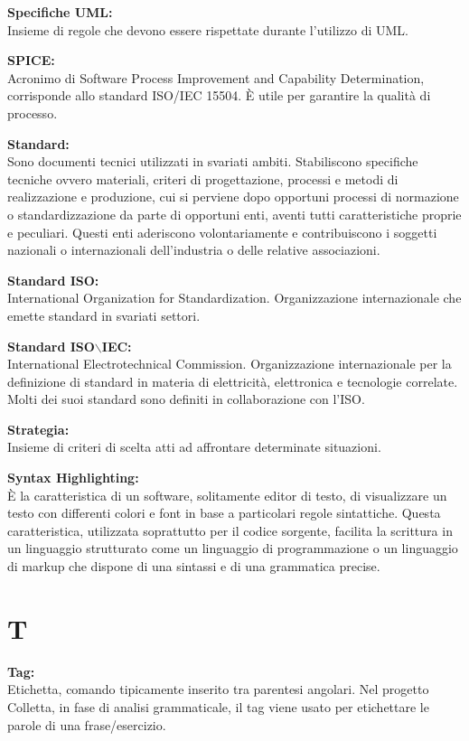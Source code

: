 \documentclass[a4paper, oneside, openany, dvipsnames, table]{article}
\begin{document}
\textbf{Specifiche UML:}\\	
Insieme di regole che devono essere rispettate durante l'utilizzo di UML.

\textbf{SPICE:}\\
Acronimo di Software Process Improvement and Capability Determination, corrisponde allo standard ISO/IEC 15504. \`E utile per garantire la qualità di processo.

\textbf{Standard:}\\	Sono documenti tecnici utilizzati in svariati ambiti. Stabiliscono specifiche tecniche ovvero materiali, criteri di progettazione, processi e metodi di realizzazione e produzione, cui si perviene dopo opportuni processi di normazione o standardizzazione da parte di opportuni enti, aventi tutti caratteristiche proprie e peculiari. Questi enti aderiscono volontariamente e contribuiscono i soggetti nazionali o internazionali dell'industria o delle relative associazioni.

\textbf{Standard ISO:}\\	International Organization for Standardization. Organizzazione internazionale che emette standard in svariati settori.

\textbf{Standard ISO$\backslash$IEC:}\\	International Electrotechnical Commission. Organizzazione internazionale per la definizione di standard in materia di elettricità, elettronica e tecnologie correlate. Molti dei suoi standard sono definiti in collaborazione con l'ISO.

\textbf{Strategia:}\\Insieme di criteri di scelta atti ad affrontare determinate situazioni.

\textbf{Syntax Highlighting:}\\	\`E la caratteristica di un software, 
solitamente editor di testo, di visualizzare un testo con differenti colori e font in base a particolari 
regole sintattiche. Questa caratteristica, utilizzata soprattutto per il codice sorgente, facilita la scrittura 
in un linguaggio strutturato come un linguaggio di programmazione o un linguaggio di markup che dispone di una 
sintassi e di una grammatica precise.
 
\newpage
\section{T}
\textbf{Tag:}\\	Etichetta, comando tipicamente inserito tra parentesi angolari. Nel progetto Colletta, in fase di analisi grammaticale, il tag viene usato per etichettare le parole di una frase/esercizio. 
\end{document}

